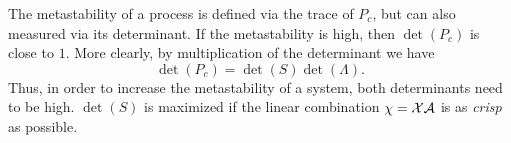 The metastability of a process is defined via the trace of $P_c$, but can also measured via its determinant.
If the metastability is high, then $\det(P_c)$ is close to $1$. More clearly, by multiplication of the determinant we have
\begin{equation*}
\det(P_c) = \det(S) \det(\Lambda).
\end{equation*}
Thus, in order to increase the metastability of a system, both determinants need to be high. $\det(S)$ is maximized if the linear combination $\chi = \mathcal{X} \mathcal{A}$ is as \textit{crisp} as possible.




